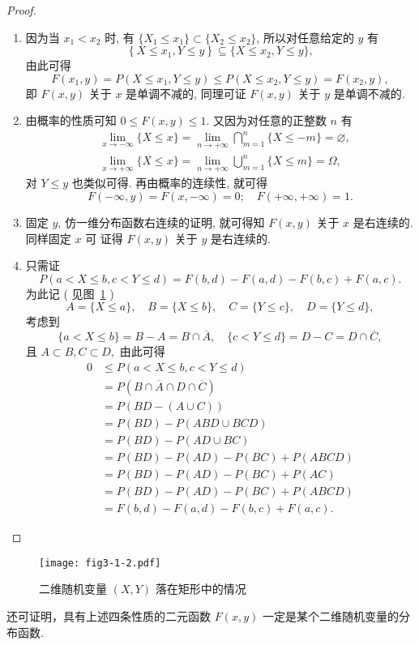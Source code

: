    \begin{proof}
    	\begin{enumerate}
    		\item  因为当 $x_1<x_2$ 时, 有 $\{X_1\leq x_1\} \subset \{X_2 \leq x_2\}$, 所以对任意给定的 $y$ 有
    		\[
    			\left\{X \leq x_{1}, Y \leq y\right\} \subseteq \{ X \leq x_{2}, Y \leq y \},
    		\]
    		由此可得
    		\[
    			F\left(x_{1}, y\right)=P\left(X \leq x_{1}, Y \leq y\right) \leq 
    			P\left(X \leq x_{2}, Y \leq y\right)=F\left(x_{2}, y\right),
    		\]
    		即 $F(x,y)$ 关于 $x$ 是单调不减的, 同理可证 $F(x,y)$ 关于 $y$ 是单调不减的.
    		\item 由概率的性质可知 $0\leq F(x,y) \leq 1$. 又因为对任意的正整数 $n$ 有
    		\begin{align*}
    			&\lim_{x\to -\infty}\{X\leq x\}=\lim_{n\to +\infty}\bigcap_{m=1}^n \{X\leq -m\}=\varnothing,	\\
    			&\lim_{x\to +\infty}\{X\leq x\}=\lim_{n\to +\infty}\bigcup_{m=1}^n\{X\leq m\}=\Omega,
    		\end{align*}
    		对 $Y \leq y$ 也类似可得. 再由概率的连续性, 就可得
    		\[
    		 	F(-\infty, y)=F(x,-\infty)=0; \quad F(+\infty,+\infty)=1.
    		\]
    		\item 固定 $y$, 仿一维分布函数右连续的证明, 就可得知 $F(x, y)$ 关于 $x$ 是右连续的. 同样固定 $x$ 可
    		证得 $F(x,y)$ 关于 $y$ 是右连续的.
        	\item 只需证
        	\[
        	 	P(a<X \leq b, c<Y \leq d)=F(b, d)-F(a, d)-F(b, c)+F(a, c).
        	\]
        	为此记 ( 见图~\ref{fig:3.1.2} )
        	\[
        	 	A=\{X \leqslant a\}, \quad B=\{ X \leqslant b \}, \quad C=\{Y \leqslant c\}, \quad D=\{Y \leqslant d\},
        	\]
        	考虑到
        	\[
        	 	\{ a<X \leqslant b \}=B-A=B \cap \overline{A}, \quad\{c<Y \leqslant d\}=D-C=D \cap \overline{C},
        	\]
        	且 $A \subset B, C\subset D,$ 由此可得
        	\begin{align*}
        		 0 & \leqslant P(a<X \leqslant b, c<Y \leqslant d) \\ 
        		 &=P(B \cap \overline{A} \cap D \cap \overline{C}) \\ 
        		 &=P(B D-(A \cup C)) \\ 
        		 &=P(B D)-P(A B D \cup B C D) \\ 
        		 &=P(B D)-P(A D \cup B C) \\ 
        		 &=P(B D)-P(A D)-P(B C)+P(A B C D) \\ 
        		 &=P(B D)-P(A D)-P(B C)+P(A C ) \\ 
        		 &=P(B D)-P(A D)-P(B C)+P(A B C D) \\ 
        		 &=F(b, d)-F(a, d)-F(b, c)+F(a, c). 
        	\end{align*}
    	\end{enumerate}
    \end{proof}
   \begin{figure}[htbp]
   	\centering
   	\texttt{[image: fig3-1-2.pdf]}
   	\caption{二维随机变量 $(X,Y)$ 落在矩形中的情况}\label{fig:3.1.2}
   \end{figure}
   还可证明，具有上述四条性质的二元函数 $F(x,y)$ 一定是某个二维随机变量的分布函数.


